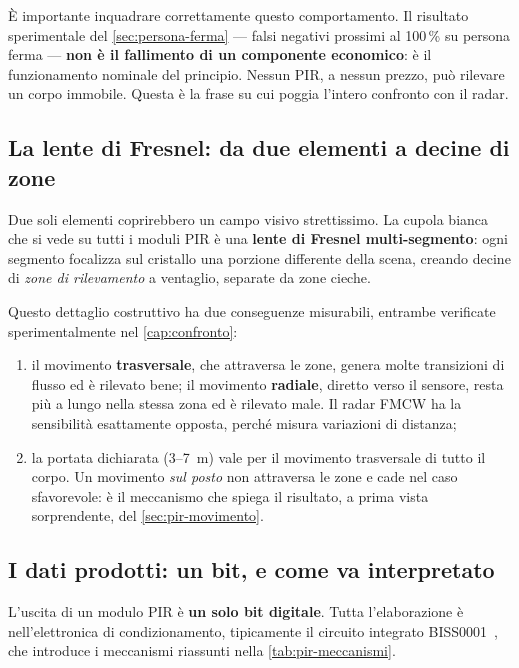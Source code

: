 È importante inquadrare correttamente questo comportamento. Il risultato
sperimentale del \cref{sec:persona-ferma} --- falsi negativi prossimi al
100\,\% su persona ferma --- \textbf{non è il fallimento di un componente
economico}: è il funzionamento nominale del principio. Nessun PIR, a nessun prezzo,
può rilevare un corpo immobile. Questa è la frase su cui poggia l'intero confronto
con il radar.

\subsection{La lente di Fresnel: da due elementi a decine di zone}
\label{sec:fresnel}

Due soli elementi coprirebbero un campo visivo strettissimo. La cupola bianca che
si vede su tutti i moduli PIR è una \textbf{lente di Fresnel multi-segmento}: ogni
segmento focalizza sul cristallo una porzione differente della scena, creando
decine di \emph{zone di rilevamento} a ventaglio, separate da zone cieche.

Questo dettaglio costruttivo ha due conseguenze misurabili, entrambe verificate
sperimentalmente nel \cref{cap:confronto}:

\begin{enumerate}[leftmargin=1.8em,itemsep=2pt]
  \item il movimento \textbf{trasversale}, che attraversa le zone, genera molte
        transizioni di flusso ed è rilevato bene; il movimento \textbf{radiale},
        diretto verso il sensore, resta più a lungo nella stessa zona ed è rilevato
        male. Il radar FMCW ha la sensibilità esattamente opposta, perché misura
        variazioni di distanza;
  \item la portata dichiarata (3--7~m) vale per il movimento trasversale di tutto
        il corpo. Un movimento \emph{sul posto} non attraversa le zone e cade nel
        caso sfavorevole: è il meccanismo che spiega il risultato, a prima vista
        sorprendente, del \cref{sec:pir-movimento}.
\end{enumerate}

\subsection{I dati prodotti: un bit, e come va interpretato}
\label{sec:pir-dati}

L'uscita di un modulo PIR è \textbf{un solo bit digitale}. Tutta l'elaborazione è
nell'elettronica di condizionamento, tipicamente il circuito integrato
BISS0001~\cite{biss0001}, che introduce i meccanismi riassunti nella
\cref{tab:pir-meccanismi}.

